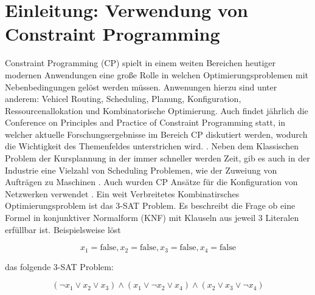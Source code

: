




\tableofcontents

\clearpage
{}


\section{Einleitung: Verwendung von Constraint Programming}
\label{sec:Einleitung-Verwendung-von-Constraint-Programming}
Constraint Programming (CP) spielt in einem weiten Bereichen heutiger modernen
Anwendungen eine große Rolle in welchen Optimierungsproblemen mit
Nebenbedingungen gelöst werden müssen. Anwenungen hierzu sind unter anderem:
Vehicel Routing, Scheduling, Planung, Konfiguration, Ressourcenallokation und
Kombinatorische Optimierung. Auch findet jährlich die  Conference on Principles
and Practice of Constraint Programming statt, in welcher aktuelle
Forschungsergebnisse im Bereich CP diskutiert werden, wodurch die Wichtigkeit
des Themenfeldes unterstrichen wird. \cite{CP20we}. Neben dem Klassischen
Problem der Kursplannung \cite{duboi96jo} in der immer schneller werden Zeit,
gib es auch in der Industrie eine Vielzahl von Scheduling Problemen, wie der
Zuweiung von Aufträgen zu Maschinen \cite{gedik16jo}. Auch wurden CP Ansätze für
die Konfiguration von Netzwerken verwendet \cite{ardisjo}. Ein weit Verbreitetes
Kombinatirsches Optimierungsproblem ist das 3-SAT Problem. Es beschreibt die
Frage ob eine Formel in konjunktiver Normalform (KNF) mit Klauseln aus jeweil 3
Literalen erfüllbar ist.
\cite[271]{rossi06bo} 
Beispielsweise löst

$$x_1=\mathrm{false},x_2=\mathrm{false},x_3=\mathrm{false},x_4=\mathrm{false}$$

das folgende 3-SAT Problem:

$$(\lnot x_1\lor x_2\lor x_3)\land(x_1\lor\lnot x_2\lor x_4)\land(x_2\lor
x_3\lor\lnot x_4)$$

